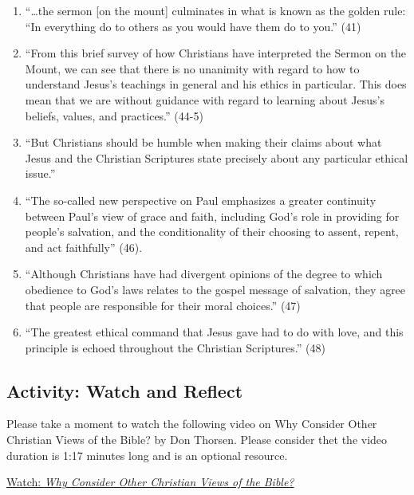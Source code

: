 \documentclass[
]{book}
\providecommand{\tightlist}{%
  \setlength{\itemsep}{0pt}\setlength{\parskip}{0pt}}
\begin{document}
\begin{enumerate}
\def\labelenumi{\arabic{enumi}.}
\tightlist
\item
  ``\ldots the sermon {[}on the mount{]} culminates in what is known as the golden rule: ``In everything do to others as you would have them do to you.'' (41)\\
\item
  ``From this brief survey of how Christians have interpreted the Sermon on the Mount, we can see that there is no unanimity with regard to how to understand Jesus's teachings in general and his ethics in particular. This does mean that we are without guidance with regard to learning about Jesus's beliefs, values, and practices.'' (44-5)\\
\item
  ``But Christians should be humble when making their claims about what Jesus and the Christian Scriptures state precisely about any particular ethical issue.''
\item
  ``The so-called new perspective on Paul emphasizes a greater continuity between Paul's view of grace and faith, including God's role in providing for people's salvation, and the conditionality of their choosing to assent, repent, and act faithfully'' (46).\\
\item
  ``Although Christians have had divergent opinions of the degree to which obedience to God's laws relates to the gospel message of salvation, they agree that people are responsible for their moral choices.'' (47)\\
\item
  ``The greatest ethical command that Jesus gave had to do with love, and this principle is echoed throughout the Christian Scriptures.'' (48)
\end{enumerate}

\hypertarget{activity-watch-and-reflect-7}{%
\subsection*{Activity: Watch and Reflect}\label{activity-watch-and-reflect-7}}

\begin{reflect}
Please take a moment to watch the following video on Why Consider Other Christian Views of the Bible? by Don Thorsen. Please consider thet the video duration is 1:17 minutes long and is an optional resource.

\href{https://www.youtube.com/watch?v=pHQiSwX-dCY}{Watch: \emph{Why Consider Other Christian Views of the Bible?}}
\end{reflect}
\end{document}
